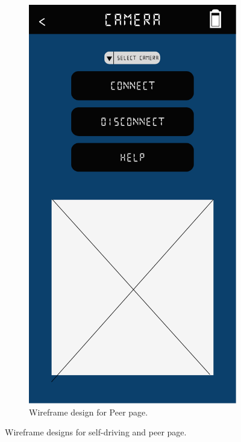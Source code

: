 \documentclass{l4proj}
\begin{document}
\begin{appendices}
\begin{figure}[!h]
\begin{subfigure}{0.32\textwidth}
        \includegraphics[width=\textwidth]{images/peer-wireframe.pdf}
        \caption{Wireframe design for Peer page.}
        \label{fig:peer-wireframe} 
    \end{subfigure}
    \caption{Wireframe designs for self-driving and peer page.}
    \label{fig:controller-wireframes}
\end{figure}



\end{appendices}
\end{document}
